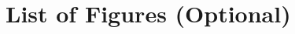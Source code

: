 \documentclass[conf]{new-aiaa}
\begin{document}
{\begin{longtable*}{@{}l @{\quad=\quad} l@{}}
\end{longtable*}}

\section*{List of Figures (Optional)}
\end{document}
